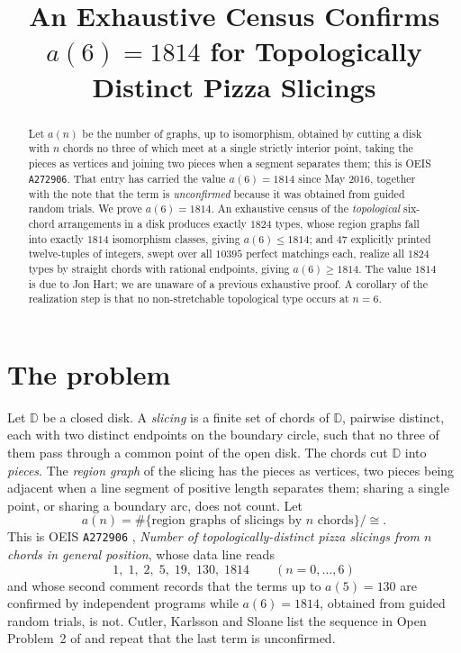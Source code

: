 \documentclass[11pt]{amsart}
\title[An exhaustive census confirms $a(6)=1814$]
{An Exhaustive Census Confirms $a(6) = 1814$ for Topologically Distinct
 Pizza Slicings}
\date{}
\theoremstyle{definition}
\theoremstyle{remark}
\newcommand{\Dsk}{\mathbb D}
\begin{document}
\begin{abstract}
Let $a(n)$ be the number of graphs, up to isomorphism, obtained by cutting a disk with
$n$ chords no three of which meet at a single strictly interior point, taking the pieces
as vertices and joining two pieces when a segment separates them; this is
OEIS \texttt{A272906}. That entry has carried the value $a(6)=1814$ since May 2016,
together with the note that the term is \emph{unconfirmed} because it was obtained from
guided random trials. We prove $a(6)=1814$. An exhaustive census of the
\emph{topological} six-chord arrangements in a disk produces exactly $1824$ types, whose
region graphs fall into exactly $1814$ isomorphism classes, giving $a(6)\le 1814$; and
$47$ explicitly printed twelve-tuples of integers, swept over all $10395$ perfect
matchings each, realize all $1824$ types by straight chords with rational endpoints,
giving $a(6)\ge 1814$. The value $1814$ is due to Jon Hart; we are unaware of a previous
exhaustive proof. A corollary of the realization step is that no non-stretchable
topological type occurs at $n=6$.
\end{abstract}

\maketitle

\section{The problem}

Let $\Dsk$ be a closed disk. A \emph{slicing} is a finite set of chords of $\Dsk$,
pairwise distinct, each with two distinct endpoints on the boundary circle, such that no
three of them pass through a common point of the open disk. The chords cut $\Dsk$ into
\emph{pieces}. The \emph{region graph} of the slicing has the pieces as vertices, two
pieces being adjacent when a line segment of positive length separates them; sharing a
single point, or sharing a boundary arc, does not count. Let
\[
 a(n)=\#\{\text{region graphs of slicings by $n$ chords}\}/{\cong}.
\]
This is OEIS \texttt{A272906} \cite{A272906}, \emph{Number of topologically-distinct
pizza slicings from $n$ chords in general position}, whose data line reads
\[
 1,\;1,\;2,\;5,\;19,\;130,\;1814
 \qquad (n=0,\ldots,6)
\]
and whose second comment records that the terms up to $a(5)=130$ are confirmed by
independent programs while $a(6)=1814$, obtained from guided random trials, is not.
Cutler, Karlsson and Sloane list the sequence in Open Problem~2 of \cite{CKS} and repeat
that the last term is unconfirmed.
\end{document}
